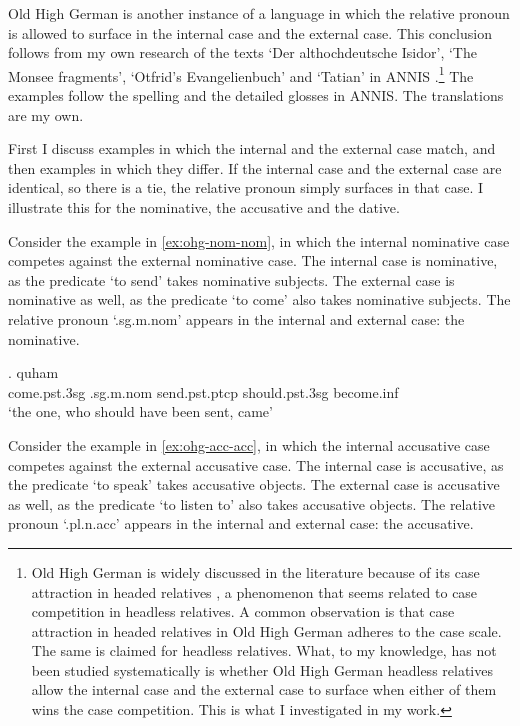 Old High German is another instance of a language in which the relative pronoun is allowed to surface in the internal case and the external case. This conclusion follows from my own research of the texts `Der althochdeutsche Isidor', `The Monsee fragments', `Otfrid's Evangelienbuch' and `Tatian' in ANNIS \citep{krause2016}.\footnote{
Old High German is widely discussed in the literature because of its case attraction in headed relatives \citep[cf.][]{pittner1995}, a phenomenon that seems related to case competition in headless relatives.
A common observation is that case attraction in headed relatives in Old High German adheres to the case scale. The same is claimed for headless relatives.
What, to my knowledge, has not been studied systematically is whether Old High German headless relatives allow the internal case and the external case to surface when either of them wins the case competition. This is what I investigated in my work.
}
The examples follow the spelling and the detailed glosses in ANNIS. The translations are my own.

First I discuss examples in which the internal and the external case match, and then examples in which they differ. If the internal case and the external case are identical, so there is a tie, the relative pronoun simply surfaces in that case. I illustrate this for the nominative, the accusative and the dative.

Consider the example in \ref{ex:ohg-nom-nom}, in which the internal nominative case competes against the external nominative case.
The internal case is nominative, as the predicate  `to send' takes nominative subjects.
The external case is nominative as well, as the predicate  `to come' also takes nominative subjects.
The relative pronoun  `.\ac{sg}.\ac{m}.\ac{nom}' appears in the internal and external case: the nominative.

\exg. quham    \\
 come.\ac{pst}.3\ac{sg}\scsub{[nom]} .\ac{sg}.\ac{m}.\ac{nom} send.\ac{pst}.\ac{ptcp}\scsub{[nom]} should.\ac{pst}.3\ac{sg} become.\ac{inf}\\
 `the one, who should have been sent, came' \label{ex:ohg-nom-nom}

Consider the example in \ref{ex:ohg-acc-acc}, in which the internal accusative case competes against the external accusative case.
The internal case is accusative, as the predicate  `to speak' takes accusative objects.
The external case is accusative as well, as the predicate  `to listen to' also takes accusative objects.
The relative pronoun  `.\ac{pl}.\ac{n}.\ac{acc}' appears in the internal and external case: the accusative.

